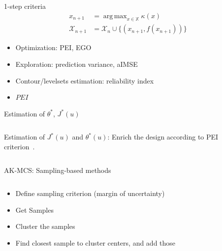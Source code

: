 \documentclass[10pt,aspectratio=169,usepdftitle=false]{beamer}
\newcommand\manupath{/home/victor/acadwriting/Manuscrit/Text/}
\newcommand{\Xspace}{\mathbb{X}}
\DeclareMathOperator*{\argmax}{arg\,max}
\newcommand{\kk}{\theta}
\newcommand{\uu}{u}
\newcommand{\inputpgf}[2][\textwidth]{
  \renewcommand\rmfamily{\sffamily}
  \resizebox{#1}{!}{}}
\begin{document}
\begin{frame}{1-step criteria}
  \begin{align}
    x_{n+1} &= \argmax_{x \in \Xspace} \kappa(x) \\
    \mathcal{X}_{n+1} &= \mathcal{X}_n \cup \{(x_{n+1},f(x_{n+1})) \}
  \end{align}
  \begin{itemize}
  \item Optimization: PEI, EGO
  \item Exploration: prediction variance, aIMSE
  \item Contour/levelsets estimation: reliability index
  \item \alert{${PEI}$}
  \end{itemize}
\end{frame}
\begin{frame}{Estimation of $\kk^*$, $J^*(\uu)$}
  
  \begin{columns}
    \begin{column}{0.45\textwidth}
  Estimation of $J^*(\uu)$ and $\kk^*(\uu)$: Enrich the design
  according to PEI criterion~\cite{ginsbourger_bayesian_2014}.
\end{column}
\begin{column}{0.45\textwidth}
  \begin{center}
    \inputpgf{\manupath Chapter4/img/PEI_example.pgf}
  \end{center}
\end{column}
\end{columns}
\end{frame}


\begin{frame}{AK-MCS: Sampling-based methods}
  \begin{columns}
    \begin{column}{0.5\textwidth}
      \begin{itemize}
      \item<1-> Define sampling criterion (margin of uncertainty)
      \item<2-> Get Samples 
      \item<3-> Cluster the samples
      \item<4-> Find closest sample to cluster centers, and add those
      \end{itemize}
    \end{column}
  \end{columns}
\end{frame}
\end{document}
